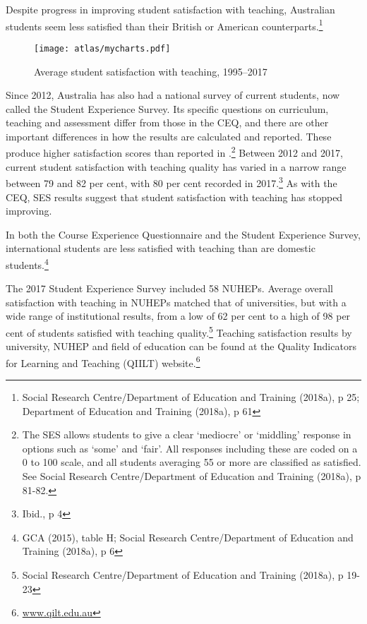\documentclass{grattan}
\begin{document}
Despite progress in improving student satisfaction with teaching, Australian students seem less satisfied than their British or American counterparts.\footnote{Social Research Centre/Department of Education and Training (2018a), p 25; Department of Education and Training (2018a), p 61}


    \begin{figure} %
    \caption{Average student satisfaction with teaching, 1995--2017}\label{fig:average-student-satisfaction-with-teaching-19952017}
    \texttt{[image: atlas/mycharts.pdf]}
    \end{figure}



Since 2012, Australia has also had a national survey of current students, now called the Student Experience Survey. Its specific questions on curriculum, teaching and assessment differ from those in the CEQ, and there are other important differences in how the results are calculated and reported. These produce higher satisfaction scores than reported in .\footnote{The SES allows students to give a clear `mediocre' or `middling' response in options such as `some' and `fair'. All responses including these are coded on a 0 to 100 scale, and all students averaging 55 or more are classified as satisfied. See Social Research Centre/Department of Education and Training (2018a), p 81-82.} Between 2012 and 2017, current student satisfaction with teaching quality has varied in a narrow range between 79 and 82 per cent, with 80 per cent recorded in 2017.\footnote{Ibid., p 4} As with the CEQ, SES results suggest that student satisfaction with teaching has stopped improving.

In both the Course Experience Questionnaire and the Student Experience Survey, international students are less satisfied with teaching than are domestic students.\footnote{GCA (2015), table H; Social Research Centre/Department of Education and Training (2018a), p 6}

The 2017 Student Experience Survey included 58 NUHEPs. Average overall satisfaction with teaching in NUHEPs matched that of universities, but with a wide range of institutional results, from a low of 62 per cent to a high of 98 per cent of students satisfied with teaching quality.\footnote{Social Research Centre/Department of Education and Training (2018a), p 19-23} Teaching satisfaction results by university, NUHEP and field of education can be found at the Quality Indicators for Learning and Teaching (QIILT) website.\footnote{\href{http://www.qilt.edu.au}{www.qilt.edu.au}}
\end{document}
